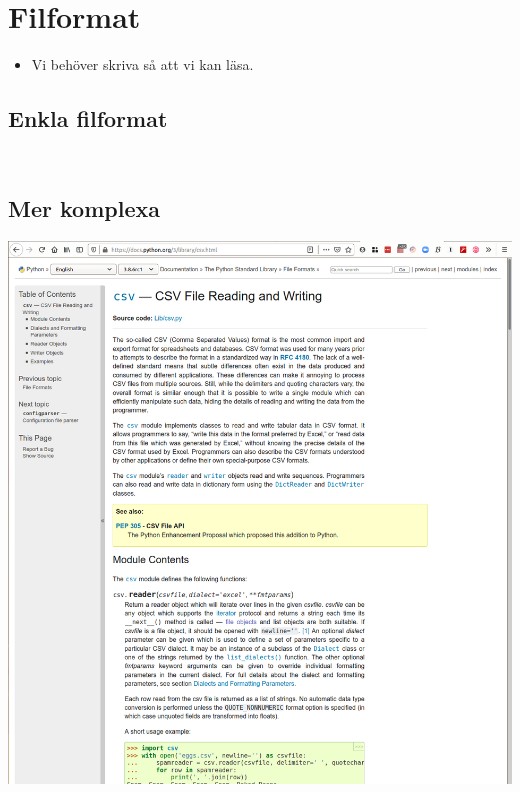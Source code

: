 \section{Filformat}

\begin{frame}[fragile]
  \begin{remark}
    \begin{itemize}
      \item Vi behöver skriva så att vi kan läsa.
    \end{itemize}
  \end{remark}
\end{frame}

\subsection{Enkla filformat}

\begin{frame}[fragile]
  \begin{example}[xy.py]
    \inputminted[firstline=3,lastline=10,firstnumber=3]{python}{examples/xy.py}
  \end{example}
\end{frame}

\begin{frame}[fragile]
  \begin{example}[xy.py]
    \inputminted[firstline=12,lastline=25,firstnumber=12]{python}{examples/xy.py}
  \end{example}
\end{frame}

\subsection{Mer komplexa}

\begin{frame}
  \includegraphics[width=\columnwidth]{figs/docs-csv.png}
\end{frame}

